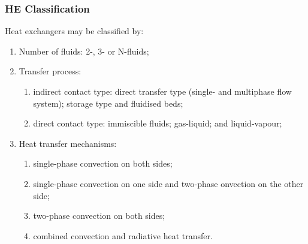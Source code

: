 \documentclass[10pt,compress,handout,ignorenonframetext,unknownkeysallowed]{beamer}
\begin{document}
\begin{frame}
 \frametitle{HE Classification}
    Heat exchangers may be classified by:
      \begin{enumerate}%
          \item<1-> Number of fluids: 2-, 3- or N-fluids;
          \item<2-> Transfer process:
             \begin{enumerate}
                 \item<2-> indirect contact type: direct transfer type (\ie single- and multiphase flow system); storage type and fluidised beds;
                 \item<2-> direct contact type: immiscible fluids; gas-liquid; and liquid-vapour;
             \end{enumerate}
          \item<3-> Heat transfer mechanisms:
             \begin{enumerate}
                 \item<3-> single-phase convection on both sides;  
                 \item<3-> single-phase convection on one side and two-phase onvection on the other side; 
                 \item<3-> two-phase convection on both sides;
                 \item<3-> combined convection and radiative heat transfer.
             \end{enumerate}
   \end{enumerate}
\end{frame}
\end{document}
